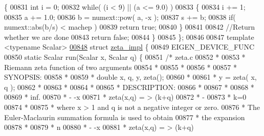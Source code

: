 \begin{DoxyCode}
       \{
00831     \textcolor{keywordtype}{int} i = 0;
00832     \textcolor{keywordflow}{while}( (i < 9) || (a <= 9.0) )
00833     \{
00834         i += 1;
00835         a += 1.0;
00836         b = numext::pow( a, -x );
00837         s += b;
00838         \textcolor{keywordflow}{if}( numext::abs(b/s) < machep )
00839             \textcolor{keywordflow}{return} \textcolor{keyword}{true};
00840     \}
00841 
00842     \textcolor{comment}{//Return whether we are done}
00843     \textcolor{keywordflow}{return} \textcolor{keyword}{false};
00844   \}
00845 \};
00846 
00847 \textcolor{keyword}{template} <\textcolor{keyword}{typename} Scalar>
\hyperlink{struct_eigen_1_1internal_1_1zeta__impl}{00848} \textcolor{keyword}{struct }\hyperlink{struct_eigen_1_1internal_1_1zeta__impl}{zeta\_impl} \{
00849     EIGEN\_DEVICE\_FUNC
00850     \textcolor{keyword}{static} Scalar run(Scalar x, Scalar q) \{
00851         \textcolor{comment}{/*                          zeta.c}
00852 \textcolor{comment}{         *}
00853 \textcolor{comment}{         *  Riemann zeta function of two arguments}
00854 \textcolor{comment}{         *}
00855 \textcolor{comment}{         *}
00856 \textcolor{comment}{         *}
00857 \textcolor{comment}{         * SYNOPSIS:}
00858 \textcolor{comment}{         *}
00859 \textcolor{comment}{         * double x, q, y, zeta();}
00860 \textcolor{comment}{         *}
00861 \textcolor{comment}{         * y = zeta( x, q );}
00862 \textcolor{comment}{         *}
00863 \textcolor{comment}{         *}
00864 \textcolor{comment}{         *}
00865 \textcolor{comment}{         * DESCRIPTION:}
00866 \textcolor{comment}{         *}
00867 \textcolor{comment}{         *}
00868 \textcolor{comment}{         *}
00869 \textcolor{comment}{         *                 inf.}
00870 \textcolor{comment}{         *                  -        -x}
00871 \textcolor{comment}{         *   zeta(x,q)  =   >   (k+q)}
00872 \textcolor{comment}{         *                  -}
00873 \textcolor{comment}{         *                 k=0}
00874 \textcolor{comment}{         *}
00875 \textcolor{comment}{         * where x > 1 and q is not a negative integer or zero.}
00876 \textcolor{comment}{         * The Euler-Maclaurin summation formula is used to obtain}
00877 \textcolor{comment}{         * the expansion}
00878 \textcolor{comment}{         *}
00879 \textcolor{comment}{         *                n}
00880 \textcolor{comment}{         *                -       -x}
00881 \textcolor{comment}{         * zeta(x,q)  =   >  (k+q)}

\end{DoxyCode}
